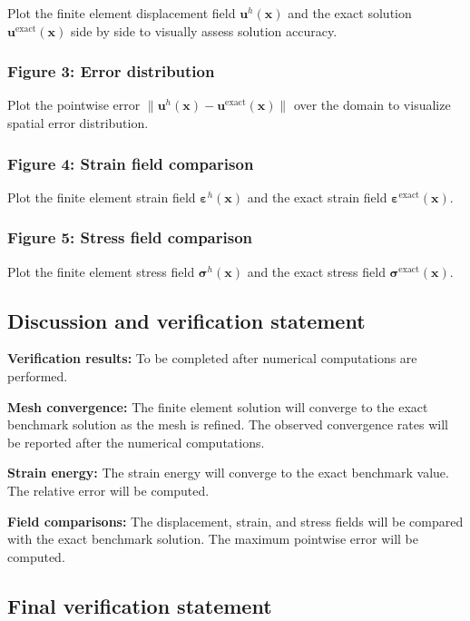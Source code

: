\documentclass[11pt]{article}
\newcommand{\bx}{\mathbf{x}}
\newcommand{\bx}{\mathbf{x}}
\begin{document}
Plot the finite element displacement field $\mathbf{u}^{h}(\bx)$ and
the exact solution $\mathbf{u}^{\mathrm{exact}}(\bx)$ side by side to
visually assess solution accuracy.

\subsubsection{Figure 3: Error distribution}

Plot the pointwise error $\|\mathbf{u}^{h}(\bx)-\mathbf{u}^{\mathrm{exact}}(\bx)\|$
over the domain to visualize spatial error distribution.

\subsubsection{Figure 4: Strain field comparison}

Plot the finite element strain field $\boldsymbol{\varepsilon}^{h}(\bx)$
and the exact strain field $\boldsymbol{\varepsilon}^{\mathrm{exact}}(\bx)$.

\subsubsection{Figure 5: Stress field comparison}

Plot the finite element stress field $\boldsymbol{\sigma}^{h}(\bx)$
and the exact stress field $\boldsymbol{\sigma}^{\mathrm{exact}}(\bx)$.

\subsection{Discussion and verification statement}
\label{ssec:discussion}

\textbf{Verification results:}
To be completed after numerical computations are performed.

\textbf{Mesh convergence:} The finite element solution will converge to the
exact benchmark solution as the mesh is refined. The observed convergence rates will be reported after the numerical computations.

\textbf{Strain energy:} The strain energy will converge to the exact
benchmark value. The relative error will be computed.

\textbf{Field comparisons:} The displacement, strain, and stress fields
will be compared with the exact benchmark solution. The maximum
pointwise error will be computed.

\subsection{Final verification statement}
\label{ssec:final_statement}
\end{document}
